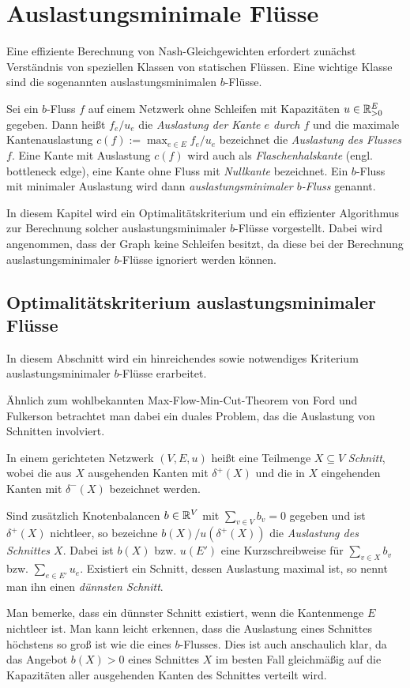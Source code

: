 \chapter{Auslastungsminimale Flüsse}\label{chapter-min-con-flows}

Eine effiziente Berechnung von Nash-Gleichgewichten erfordert zunächst Verständnis von speziellen Klassen von statischen Flüssen.
Eine wichtige Klasse sind die sogenannten auslastungsminimalen $b$-Flüsse.

\begin{definition}
	Sei ein $b$-Fluss $f$ auf einem Netzwerk ohne Schleifen mit Kapazitäten $u\in\mathbb{R}_{>0}^E$ gegeben.
	Dann heißt $f_e/u_e$ die \emph{Auslastung der Kante $e$ durch $f$} und die maximale Kantenauslastung $c(f):=\max_{e\in E} f_e/u_e$ bezeichnet die \emph{Auslastung des Flusses $f$}.
	Eine Kante mit Auslastung $c(f)$ wird auch als \emph{Flaschenhalskante} (engl. bottleneck edge), eine Kante ohne Fluss mit \emph{Nullkante} bezeichnet.
	Ein $b$-Fluss mit minimaler Auslastung wird dann \emph{auslastungsminimaler $b$-Fluss} genannt.
\end{definition}

In diesem Kapitel wird ein Optimalitätskriterium und ein effizienter Algorithmus zur Berechnung solcher auslastungsminimaler $b$-Flüsse vorgestellt.
Dabei wird angenommen, dass der Graph keine Schleifen besitzt, da diese bei der Berechnung auslastungsminimaler $b$-Flüsse ignoriert werden können.

\section{Optimalitätskriterium auslastungsminimaler Flüsse}

In diesem Abschnitt wird ein hinreichendes sowie notwendiges Kriterium auslastungsminimaler $b$-Flüsse erarbeitet.

Ähnlich zum wohlbekannten Max-Flow-Min-Cut-Theorem von Ford und Fulkerson betrachtet man dabei ein duales Problem, das die Auslastung von Schnitten involviert.

\begin{definition}[Schnitt]
	In einem gerichteten Netzwerk $(V, E, u)$ heißt eine Teilmenge $X\subseteq V$ \emph{Schnitt}, wobei die aus $X$ ausgehenden Kanten mit $\delta^+(X)$ und die in $X$ eingehenden Kanten mit $\delta^-(X)$ bezeichnet werden.
	
	Sind zusätzlich Knotenbalancen $b\in\mathbb{R}^V$ mit $\sum_{v\in V} b_v = 0$ gegeben und ist $\delta^+(X)$ nichtleer, so bezeichne $b(X) / u(\delta^+(X))$ die \emph{Auslastung des Schnittes $X$}.
	Dabei ist $b(X)$ bzw. $u(E')$ eine Kurzschreibweise für $\sum_{v\in X} b_v$ bzw. $\sum_{e\in E'} u_e$.
	Existiert ein Schnitt, dessen Auslastung maximal ist, so nennt man ihn einen \emph{dünnsten Schnitt}.
\end{definition}
Man bemerke, dass ein dünnster Schnitt existiert, wenn die Kantenmenge $E$ nichtleer ist.
Man kann leicht erkennen, dass die Auslastung eines Schnittes höchstens so groß ist wie die eines $b$-Flusses.
Dies ist auch anschaulich klar, da das Angebot $b(X) > 0$ eines Schnittes $X$ im besten Fall gleichmäßig auf die Kapazitäten aller ausgehenden Kanten des Schnittes verteilt wird.

